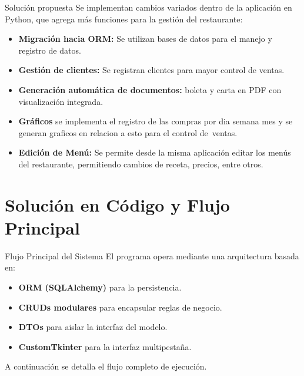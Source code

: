 \documentclass{beamer}
\begin{document}
\begin{frame}{Solución propuesta}
Se implementan cambios variados dentro de la aplicación en Python, que agrega más funciones para la gestión del restaurante:

\begin{itemize}
    
    \item \textbf{Migración hacia ORM:} Se utilizan bases de datos para el manejo y registro de datos.
    \item \textbf{Gestión de clientes:} Se registran clientes para mayor control de ventas.
    \item \textbf{Generación automática de documentos:} boleta y carta en PDF con visualización integrada.
    \item \textbf{Gráficos} se implementa el registro de las compras por dia semana mes y se generan graficos en relacion a esto para el control de ventas.
    \item \textbf{Edición de Menú:}  Se permite desde la misma aplicación editar los menús del restaurante, permitiendo cambios de receta, precios, entre otros.
\end{itemize}
\end{frame}

\section{Solución en Código y Flujo Principal}

\begin{frame}{Flujo Principal del Sistema}
El programa opera mediante una arquitectura basada en:
\begin{itemize}
    \item \textbf{ORM (SQLAlchemy)} para la persistencia.
    \item \textbf{CRUDs modulares} para encapsular reglas de negocio.
    \item \textbf{DTOs} para aislar la interfaz del modelo.
    \item \textbf{CustomTkinter} para la interfaz multipestaña.
\end{itemize}

\bigskip
A continuación se detalla el flujo completo de ejecución.
\end{frame}
\end{document}
